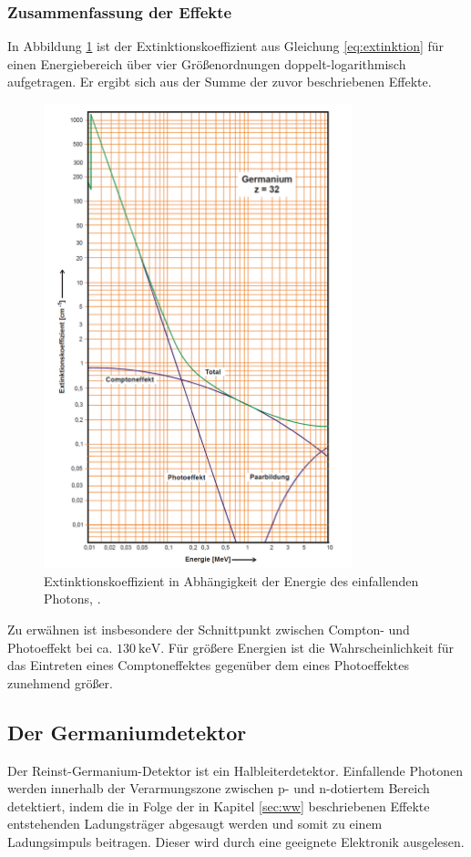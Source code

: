 \subsubsection{Zusammenfassung der Effekte}
In Abbildung \ref{fig:extinktionskoeffizient} ist der Extinktionskoeffizient aus Gleichung \eqref{eq:extinktion} für einen Energiebereich über vier Größenordnungen doppelt-logarithmisch aufgetragen. Er ergibt sich aus der Summe der zuvor beschriebenen Effekte.
\begin{figure}
  \centering
  \includegraphics[width=0.8\textwidth]{ressources/extinktionskoeffizient.png}
  \caption{Extinktionskoeffizient in Abhängigkeit der Energie des einfallenden Photons, \cite{skript}.}
  \label{fig:extinktionskoeffizient}
\end{figure}
Zu erwähnen ist insbesondere der Schnittpunkt zwischen Compton- und Photoeffekt bei ca. $\SI{130}{\kilo\electronvolt}$. Für größere Energien ist die Wahrscheinlichkeit für das Eintreten eines Comptoneffektes gegenüber dem eines Photoeffektes zunehmend größer.


\subsection{Der Germaniumdetektor}
\label{sec:detektor}
Der Reinst-Germanium-Detektor ist ein Halbleiterdetektor. Einfallende Photonen werden innerhalb der Verarmungszone zwischen p- und n-dotiertem Bereich detektiert, indem die in Folge der in Kapitel \ref{sec:ww} beschriebenen Effekte entstehenden Ladungsträger abgesaugt werden und somit zu einem Ladungsimpuls beitragen. Dieser wird durch eine geeignete Elektronik ausgelesen.

